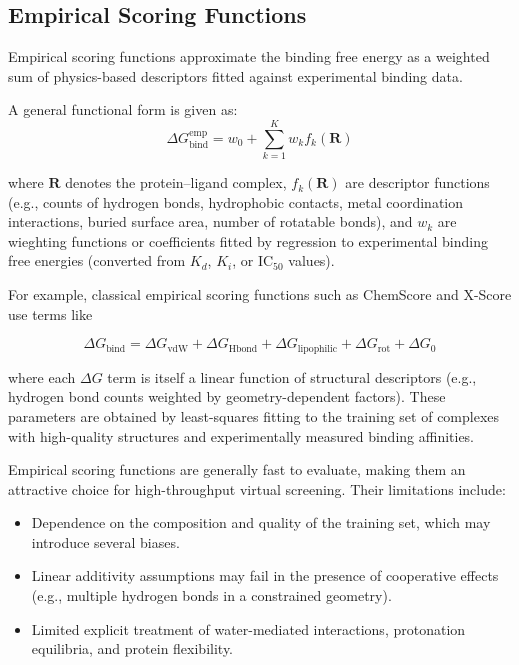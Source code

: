 \documentclass[12pt]{article}
\begin{document}
\subsection{Empirical Scoring Functions}

Empirical scoring functions approximate the binding free energy as a weighted sum of physics-based descriptors fitted against experimental binding data. 

A general functional form is given as:
\begin{equation}
\Delta G_{\text{bind}}^{\text{emp}} = w_0 + \sum_{k=1}^{K} w_k f_k(\mathbf{R})
\label{eq:empirical_general}
\end{equation}

where $\mathbf{R}$ denotes the protein--ligand complex, $f_k(\mathbf{R})$ are descriptor functions (e.g., counts of hydrogen bonds, hydrophobic contacts, metal coordination interactions, buried surface area, number of rotatable bonds), and $w_k$ are wieghting functions or coefficients fitted by regression to experimental binding free energies (converted from $K_d$, $K_i$, or IC$_{50}$ values).\cite{CH3_Wang2017}

For example, classical empirical scoring functions such as ChemScore and X-Score use terms like

\begin{equation}
\Delta G_{\text{bind}} = \Delta G_{\text{vdW}} + \Delta G_{\text{Hbond}} + \Delta G_{\text{lipophilic}} + \Delta G_{\text{rot}} + \Delta G_0
\label{eq:classicalEMP}
\end{equation}

where each $\Delta G$ term is itself a linear function of structural descriptors (e.g., hydrogen bond counts weighted by geometry-dependent factors). These parameters are obtained by least-squares fitting to the training set of complexes with high-quality structures and experimentally measured binding affinities.\cite{CH3_Wang2017}

Empirical scoring functions are generally fast to evaluate, making them an attractive choice for high-throughput virtual screening. 
Their limitations include:
\begin{itemize}
    \item Dependence on the composition and quality of the training set, which may introduce several biases.
    \item Linear additivity assumptions may fail in the presence of cooperative effects (e.g., multiple hydrogen bonds in a constrained geometry).
    \item Limited explicit treatment of water-mediated interactions, protonation equilibria, and protein flexibility.
\end{itemize}
\end{document}
